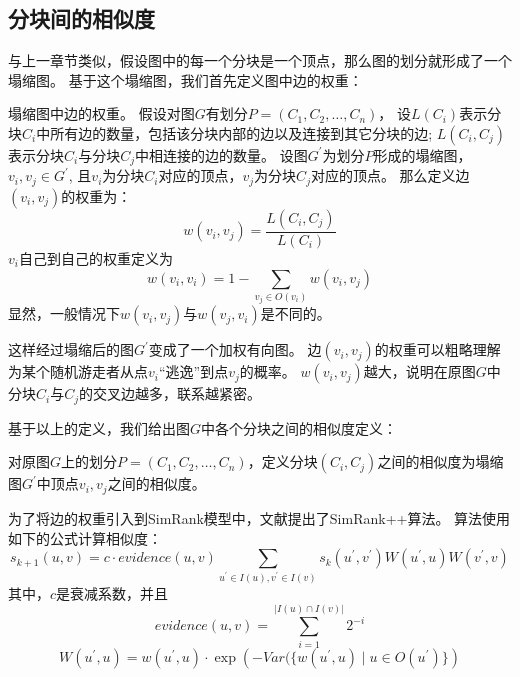 \documentclass[master]{njuthesis}
\begin{document}
\subsection{分块间的相似度}
与上一章节类似，假设图中的每一个分块是一个顶点，那么图的划分就形成了一个塌缩图。
基于这个塌缩图，我们首先定义图中边的权重：
\begin{definition}
 塌缩图中边的权重。 假设对图$G$有划分$P=(C_1, C_2, \dots, C_n)$，
 设$L(C_i)$表示分块$C_i$中所有边的数量，包括该分块内部的边以及连接到其它分块的边;
 $L(C_i, C_j)$表示分块$C_i$与分块$C_j$中相连接的边的数量。
 设图$G^\prime$为划分$P$形成的塌缩图，$v_i, v_j \in G^\prime$, 
 且$v_i$为分块$C_i$对应的顶点，$v_j$为分块$C_j$对应的顶点。
 那么定义边$(v_i, v_j)$的权重为：
\begin{equation}
 w(v_i, v_j) = \frac{L(C_i, C_j)}{L(C_i)} 
\end{equation}
$v_i$自己到自己的权重定义为
\begin{equation}
 w(v_i, v_i) = 1-\sum_{v_j \in O(v_i)}{w(v_i, v_j)}
 \end{equation}
显然，一般情况下$w(v_i, v_j)$与$w(v_j, v_i)$是不同的。
\end{definition}
这样经过塌缩后的图$G^\prime$变成了一个加权有向图。
边$(v_i, v_j)$的权重可以粗略理解为某个随机游走者从点$v_i$“逃逸”到点$v_j$的概率。
$w(v_i, v_j)$越大，说明在原图$G$中分块$C_i$与$C_j$的交叉边越多，联系越紧密。

基于以上的定义，我们给出图$G$中各个分块之间的相似度定义：
\begin{definition}
 对原图$G$上的划分$P=(C_1, C_2, \dots, C_n)$，定义分块$(C_i, C_j)$之间的相似度为塌缩图$G^\prime$中顶点$v_i,v_j$之间的相似度。
\end{definition}
 为了将边的权重引入到SimRank模型中，文献\cite{DBLP:journals/pvldb/AntonellisGC08}提出了SimRank++算法。
 算法使用如下的公式计算相似度：
\begin{equation}
  s_{k+1}(u,v) = c \cdot evidence(u,v)  
  \sum_{u^\prime \in I(u), v^\prime \in I(v)} s_{k}(u^\prime, v^\prime)W(u^\prime, u)W(v^\prime, v)
\end{equation}
其中，$c$是衰减系数，并且
\begin{equation}
    evidence(u,v)=\sum_{i=1}^{|I(u)\cap I(v)|}2^{-i} 
   \end{equation}
\begin{equation}
     W(u^\prime, u)=w(u^\prime, u)\cdot \exp(-{Var(\{w(u^\prime,u) \mid u \in O(u^\prime)\}})
\end{equation}
\end{document}
